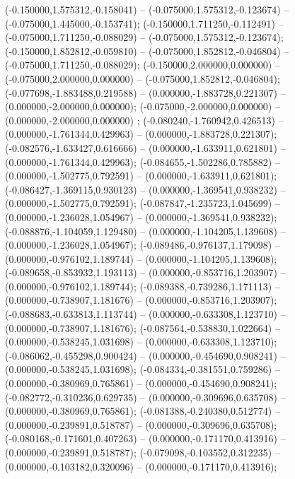  (-0.150000,1.575312,-0.158041) -- (-0.075000,1.575312,-0.123674) -- (-0.075000,1.445000,-0.153741);
 (-0.150000,1.711250,-0.112491) -- (-0.075000,1.711250,-0.088029) -- (-0.075000,1.575312,-0.123674);
 (-0.150000,1.852812,-0.059810) -- (-0.075000,1.852812,-0.046804) -- (-0.075000,1.711250,-0.088029);
 (-0.150000,2.000000,0.000000) -- (-0.075000,2.000000,0.000000) -- (-0.075000,1.852812,-0.046804);
 (-0.077698,-1.883488,0.219588) -- (0.000000,-1.883728,0.221307) -- (0.000000,-2.000000,0.000000);
 (-0.075000,-2.000000,0.000000) -- (0.000000,-2.000000,0.000000) ;
 (-0.080240,-1.760942,0.426513) -- (0.000000,-1.761344,0.429963) -- (0.000000,-1.883728,0.221307);
 (-0.082576,-1.633427,0.616666) -- (0.000000,-1.633911,0.621801) -- (0.000000,-1.761344,0.429963);
 (-0.084655,-1.502286,0.785882) -- (0.000000,-1.502775,0.792591) -- (0.000000,-1.633911,0.621801);
 (-0.086427,-1.369115,0.930123) -- (0.000000,-1.369541,0.938232) -- (0.000000,-1.502775,0.792591);
 (-0.087847,-1.235723,1.045699) -- (0.000000,-1.236028,1.054967) -- (0.000000,-1.369541,0.938232);
 (-0.088876,-1.104059,1.129480) -- (0.000000,-1.104205,1.139608) -- (0.000000,-1.236028,1.054967);
 (-0.089486,-0.976137,1.179098) -- (0.000000,-0.976102,1.189744) -- (0.000000,-1.104205,1.139608);
 (-0.089658,-0.853932,1.193113) -- (0.000000,-0.853716,1.203907) -- (0.000000,-0.976102,1.189744);
 (-0.089388,-0.739286,1.171113) -- (0.000000,-0.738907,1.181676) -- (0.000000,-0.853716,1.203907);
 (-0.088683,-0.633813,1.113744) -- (0.000000,-0.633308,1.123710) -- (0.000000,-0.738907,1.181676);
 (-0.087564,-0.538830,1.022664) -- (0.000000,-0.538245,1.031698) -- (0.000000,-0.633308,1.123710);
 (-0.086062,-0.455298,0.900424) -- (0.000000,-0.454690,0.908241) -- (0.000000,-0.538245,1.031698);
 (-0.084334,-0.381551,0.759286) -- (0.000000,-0.380969,0.765861) -- (0.000000,-0.454690,0.908241);
 (-0.082772,-0.310236,0.629735) -- (0.000000,-0.309696,0.635708) -- (0.000000,-0.380969,0.765861);
 (-0.081388,-0.240380,0.512774) -- (0.000000,-0.239891,0.518787) -- (0.000000,-0.309696,0.635708);
 (-0.080168,-0.171601,0.407263) -- (0.000000,-0.171170,0.413916) -- (0.000000,-0.239891,0.518787);
 (-0.079098,-0.103552,0.312235) -- (0.000000,-0.103182,0.320096) -- (0.000000,-0.171170,0.413916);
